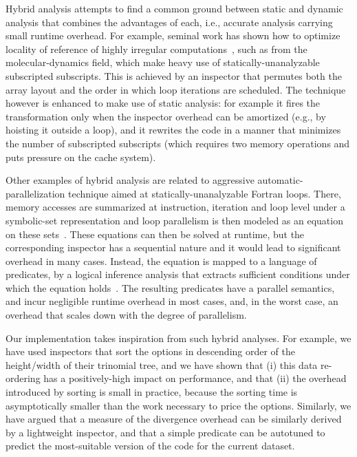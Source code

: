 Hybrid analysis attempts to find a common ground between static and dynamic analysis that combines the advantages of each, i.e., accurate analysis carrying small runtime overhead. For example, seminal work has shown how to optimize locality of reference of highly irregular computations~\cite{Kennedy:DataReord,Strout:DataItReord}, such as from the molecular-dynamics field, which make heavy use of statically-unanalyzable subscripted subscripts. This is achieved by an inspector that permutes both the array layout and the order in which loop iterations are scheduled.  The technique however is enhanced to make use of static analysis: for example it fires the transformation only when the inspector overhead can be amortized (e.g., by hoisting it outside a loop), and it rewrites the code in a manner that minimizes the number of subscripted subscripts (which requires two memory operations and puts pressure on the cache system).

Other examples of hybrid analysis are related to aggressive automatic-parallelization technique aimed at statically-unanalyzable Fortran loops. There, memory accesses are summarized at instruction, iteration and loop level under a symbolic-set representation and loop parallelism is then modeled as an equation on these sets~\cite{SUIF,HybAn}. These equations can then be solved at runtime, but the corresponding inspector has a sequential nature and it would lead to significant overhead in many cases. Instead, the equation is mapped to a language of predicates, by a logical inference analysis that extracts sufficient conditions under which the equation holds~\cite{Moon99PredArrDataFlow,SummaryMonot}. The resulting predicates have a parallel semantics, and incur negligible runtime overhead in most cases, and, in the worst case, an overhead that scales down with the degree of parallelism.    

Our implementation takes inspiration from such hybrid analyses. For example, we have used inspectors that sort the options in descending order of the height/width of their trinomial tree, and we have shown that (i) this data re-ordering has a positively-high impact on performance, and that (ii) the overhead introduced by sorting is small in practice, because the sorting time is asymptotically smaller than the work necessary to price the options. Similarly, we have argued that a measure of the divergence overhead can be similarly derived by a lightweight inspector, and that a simple predicate can be autotuned to predict the most-suitable version of the code for the current dataset.


